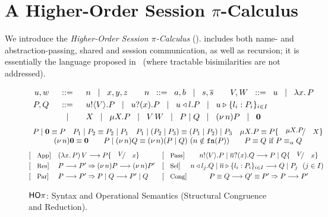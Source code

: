 \documentclass[a4paper,UKenglish]{lipics}
\theoremstyle{definition}
\begin{document}
\section{A Higher-Order Session $\pi$-Calculus}
\label{sec:calculus}

\noindent 
We introduce the %
\emph{Higher-Order Session $\pi$-Calculus} (\HOp).
\HOp includes both name- and abstraction-passing, shared and session communication,  
as well as recursion; it is 
essentially 
the  language
proposed 
in~\cite{tlca07} (where tractable bisimilarities are not addressed). 

\smallskip

 


	\begin{figure}
	\[
		\begin{array}{rcl}
			u,w &\;\;::=\;\;& n \;\;\;|\;\;\; x,y,z \qquad
			n \;\;::=\;\; a,b  \;\;\;|\;\;\; s, \overline{s} \qquad 
			V,W  \;\;::=\;\; u \;\;\;|\;\;\; \lambda x.\,P \\[1mm]
			P,Q & \;\;::=\;\; & u ! \langle V \rangle .{P}  \;\;\;|\;\;\;  u ? (x) .{P} \;\;\;|\;\;\;
			u \triangleleft l . P \;\;\;|\;\;\; u \triangleright \{l_i:P_i\}_{i \in I}   \\[1mm]
			& \;\;\;|\;\;\; & X \;\;\;|\;\;\; \mu X. P \;\;\;|\;\;\; V\, {W} \;\;\;|\;\;\; P\;|\; Q \;\;\;|\;\;\; (\nu\, n) P \;\;\;|\;\;\; \mathbf{0}
		\end{array}
	\]
	\[
	\begin{array}{c}
		P \Par \inact \scong P
		\quad
		P_1 \Par P_2 \scong P_2 \Par P_1
		\quad
		P_1 \Par (P_2 \Par P_3) \scong (P_1 \Par P_2) \Par P_3
		\quad 
		\recp{X}{P} \scong P\subst{\recp{X}{P}}{\rvar{X}}
		\\%

		\news{n} \inact \scong \inact
		\qquad 
		P \Par \news{n} Q \scong \news{n}(P \Par Q)
		\	(n \notin \fn{P})
		\qquad
		P \scong Q \textrm{ if } P \scong_\alpha Q
	\end{array}
\]
	\[
		\!\!\!\begin{array}{lllcrll}
			\orule{App} & (\abs{x}{P}) \, V   \red    P \subst{V}{x}
			& 
			  

			\orule{Pass} & \bout{n}{V} P \Par \binp{\dual{n}}{x} Q   \red   P \Par Q \subst{V}{x} 
			
			\\[1mm]

			 \orule{Res} & P \red P'  \Rightarrow  \news{n} P  \red  \news{n} P' 

			&  
			\orule{Sel}
			&  \!\!\! \bsel{n}{l_j} Q \Par \bbra{\dual{n}}{l_i : P_i}_{i \in I}  \red   Q \Par P_j ~~(j \in I)
			
			\\[1mm]
			\orule{Par} & P \red P'   \Rightarrow    P \Par Q  \red   P' \Par Q  
			&  
			\orule{Cong} & P \scong Q \red Q' \scong P'   \Rightarrow  P  \red  P' 
	\end{array}
	\]
\caption{$\mathsf{HO}\pi$: Syntax and Operational Semantics (Structural Congruence and Reduction).
\label{fig:redsem}}
\end{figure}
\end{document}
